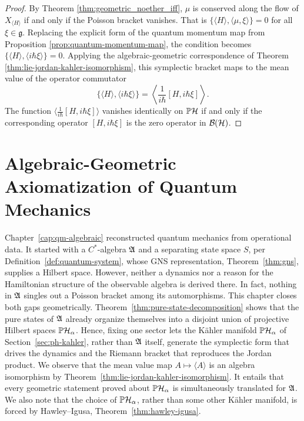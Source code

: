 \begin{proof}
	By Theorem \ref{thm:geometric_noether_iff}, $\mu$ is conserved along the flow of $X_{\langle H \rangle}$ if and only if the Poisson bracket vanishes. That is $\{ \langle H \rangle, \langle \mu, \xi \rangle \} = 0$ for all $\xi \in \mathfrak{g}$. Replacing the explicit form of the quantum momentum map from Proposition \ref{prop:quantum-momentum-map}, the condition becomes $\{ \langle H \rangle, \langle i\hbar \xi \rangle \} = 0$. Applying the algebraic-geometric correspondence of Theorem \ref{thm:lie-jordan-kahler-isomorphism}, this symplectic bracket maps to the mean value of the operator commutator
	\begin{equation}
		\{ \langle H \rangle, \langle i\hbar \xi \rangle \} = \left\langle \frac{1}{i\hbar} [H, i\hbar \xi] \right\rangle.
	\end{equation}
	The function $\langle \frac{1}{i\hbar} [H, i\hbar \xi] \rangle$ vanishes identically on $\PH$ if and only if the corresponding operator $[H, i\hbar \xi]$ is the zero operator in $\BH$.
\end{proof}

\section{Algebraic-Geometric Axiomatization of Quantum Mechanics}
\label{sec:unification}

Chapter~\ref{cap:qm-algebraic} reconstructed quantum mechanics from operational data. It started with a $C^*$-algebra $\mathfrak{A}$ and a separating state space $S$,  per Definition~\ref{def:quantum-system}, whose GNS representation, Theorem~\ref{thm:gns}, supplies a Hilbert space. However, neither a dynamics nor a reason for the Hamiltonian structure of the observable algebra is derived there. In fact, nothing in $\mathfrak{A}$ singles out a Poisson bracket among its automorphisms. This chapter closes both gaps geometrically. Theorem~\ref{thm:pure-state-decomposition} shows that the pure states of $\mathfrak{A}$ already organize themselves into a disjoint union of projective Hilbert spaces $\PH_\alpha$. Hence, fixing one sector lets the Kähler manifold $\PH_\alpha$ of Section~\ref{sec:ph-kahler}, rather than $\mathfrak{A}$ itself, generate the symplectic form that drives the dynamics and the Riemann bracket that reproduces the Jordan product. We observe that the mean value map $A\mapsto\langle A\rangle$ is an algebra isomorphism by Theorem~\ref{thm:lie-jordan-kahler-isomorphism}. It entails that every geometric statement proved about $\PH_\alpha$ is simultaneously translated for $\mathfrak{A}$. We also note that the choice of $\PH_\alpha$, rather than some other Kähler manifold, is forced by Hawley--Igusa, Theorem~\ref{thm:hawley-igusa}. 


